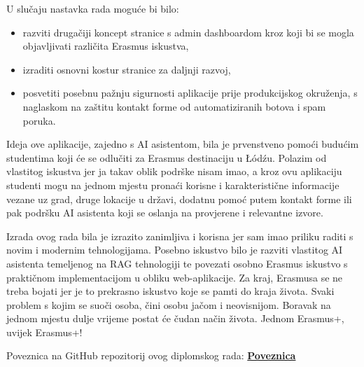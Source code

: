 \documentclass[]{foi}
\begin{document}
U slučaju nastavka rada moguće bi bilo:
\begin{itemize}
    \item razviti drugačiji koncept stranice s admin dashboardom kroz koji bi se mogla objavljivati različita Erasmus iskustva,
    \item izraditi osnovni kostur stranice za daljnji razvoj,
    \item posvetiti posebnu pažnju sigurnosti aplikacije prije produkcijskog okruženja, s naglaskom na zaštitu kontakt forme od automatiziranih botova i spam poruka.
\end{itemize}

Ideja ove aplikacije, zajedno s AI asistentom, bila je prvenstveno pomoći budućim studentima koji će se odlučiti za Erasmus destinaciju u Łódźu. Polazim od vlastitog 
iskustva jer ja takav oblik podrške nisam imao, a kroz ovu aplikaciju studenti mogu na jednom mjestu pronaći korisne i karakteristične informacije vezane uz grad, 
druge lokacije u državi, dodatnu pomoć putem kontakt forme ili pak podršku AI asistenta koji se oslanja na provjerene i relevantne izvore.

Izrada ovog rada bila je izrazito zanimljiva i korisna jer sam imao priliku raditi s novim i modernim tehnologijama. Posebno iskustvo bilo je razviti vlastitog AI asistenta temeljenog na RAG tehnologiji te povezati osobno Erasmus iskustvo s praktičnom implementacijom u obliku web-aplikacije.
Za kraj, Erasmusa se ne treba bojati jer je to prekrasno iskustvo koje se pamti do kraja života. Svaki problem s kojim se suoči osoba, čini osobu jačom i neovisnijom. 
Boravak na jednom mjestu dulje vrijeme postat će čudan način života. Jednom Erasmus+, uvijek Erasmus+!

Poveznica na GitHub repozitorij ovog diplomskog rada: \href{https://github.com/ababic20/Website-with-a-chatbot.git}{\textbf{Poveznica}} 

\makebackmatter
\end{document}
